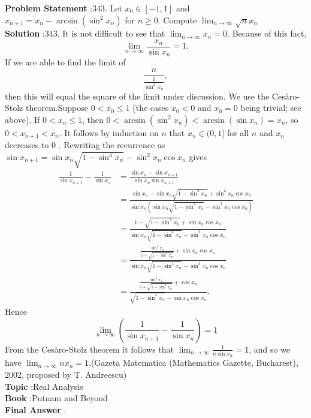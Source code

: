 \documentclass[10pt]{article}
\begin{document}
\textbf{Problem Statement} :343. Let $x_{0} \in[-1,1]$ and $x_{n+1}=x_{n}-\arcsin \left(\sin ^{2} x_{n}\right)$ for $n \geq 0$. Compute $\lim _{n \rightarrow \infty} \sqrt{n} x_{n}$\\
\textbf{Solution} :343. It is not difficult to see that $\lim _{n \rightarrow \infty} x_{n}=0$. Because of this fact,$$ \lim _{n \rightarrow \infty} \frac{x_{n}}{\sin x_{n}}=1 . $$If we are able to find the limit of$$ \frac{n}{\frac{1}{\sin ^{2} x_{n}}}, $$then this will equal the square of the limit under discussion. We use the Cesàro-Stolz theorem.Suppose $0<x_{0} \leq 1$ (the cases $x_{0}<0$ and $x_{0}=0$ being trivial; see above). If $0<x_{n} \leq 1$, then $0<\arcsin \left(\sin ^{2} x_{n}\right)<\arcsin \left(\sin x_{n}\right)=x_{n}$, so $0<x_{n+1}<x_{n}$. It follows by induction on $n$ that $x_{n} \in(0,1]$ for all $n$ and $x_{n}$ decreases to 0 . Rewriting the recurrence as $\sin x_{n+1}=\sin x_{n} \sqrt{1-\sin ^{4} x_{n}}-\sin ^{2} x_{n} \cos x_{n}$ gives$$ \begin{aligned} \frac{1}{\sin x_{n+1}}-\frac{1}{\sin x_{n}} &=\frac{\sin x_{n}-\sin x_{n+1}}{\sin x_{n} \sin x_{n+1}} \\ &=\frac{\sin x_{n}-\sin x_{n} \sqrt{1-\sin ^{4} x_{n}}+\sin ^{2} x_{n} \cos x_{n}}{\sin x_{n}\left(\sin x_{n} \sqrt{1-\sin ^{4} x_{n}}-\sin ^{2} x_{n} \cos x_{n}\right)} \\ &=\frac{1-\sqrt{1-\sin ^{4} x_{n}}+\sin x_{n} \cos x_{n}}{\sin x_{n} \sqrt{1-\sin ^{4} x_{n}}-\sin ^{2} x_{n} \cos x_{n}} \\ &=\frac{\frac{\sin ^{4} x_{n}}{1+\sqrt{1-\sin ^{4} x_{n}}}+\sin x_{n} \cos x_{n}}{\sin x_{n} \sqrt{1-\sin ^{4} x_{n}}-\sin ^{2} x_{n} \cos x_{n}} \\ &=\frac{\frac{\sin ^{3} x_{n}}{1+\sqrt{1-\sin ^{4} x_{n}}}+\cos x_{n}}{\sqrt{1-\sin ^{4} x_{n}}-\sin x_{n} \cos x_{n}} . \end{aligned} $$Hence$$ \lim _{n \rightarrow \infty}\left(\frac{1}{\sin x_{n+1}}-\frac{1}{\sin x_{n}}\right)=1 $$From the Cesàro-Stolz theorem it follows that $\lim _{n \rightarrow \infty} \frac{1}{n \sin x_{n}}=1$, and so we have $\lim _{n \rightarrow \infty} n x_{n}=1$.(Gazeta Matematica (Mathematics Gazette, Bucharest), 2002, proposed by T. Andreescu)\\
\textbf{Topic} :Real Analysis\\
\textbf{Book} :Putnam and Beyond\\
\textbf{Final Answer} :\\
\end{document}
